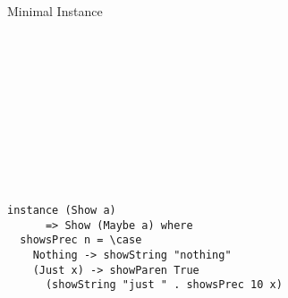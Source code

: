 \documentclass[aspectratio=169]{beamer}
\begin{document}
\begin{frame}[fragile]{Minimal Instance}
\hspace{-1cm}
\begin{minipage}{.59\textwidth}%
\begin{code}%
\>[0]\<%
\\
\>[0][@{}l@{\AgdaIndent{0}}]%
\>[2]\AgdaSpace{}%
\AgdaSymbol{:}\AgdaSpace{}%
\AgdaSymbol{\{\{}\AgdaSpace{}%
\AgdaSymbol{\}\}}\AgdaSpace{}%
\AgdaSpace{}%
\AgdaSpace{}%
\AgdaSymbol{(}\AgdaSpace{}%
\AgdaSymbol{)}\<%
\\
%
\>[2]\AgdaSpace{}%
\AgdaSymbol{\{}\AgdaSpace{}%
\AgdaSymbol{=}\AgdaSpace{}%
\AgdaSymbol{\}}\AgdaSpace{}%
\AgdaSymbol{=}\AgdaSpace{}%
\AgdaSpace{}%
\AgdaSymbol{\{}\AgdaSpace{}%
\AgdaSymbol{\}}\<%
\\
\>[2][@{}l@{\AgdaIndent{0}}]%
\>[4]\<%
\\
\>[4][@{}l@{\AgdaIndent{0}}]%
\>[6]\AgdaSpace{}%
\AgdaSymbol{:}\AgdaSpace{}%
\AgdaSpace{}%
\AgdaSymbol{(}\AgdaSpace{}%
\AgdaSymbol{)}\<%
\\
%
\>[6]\AgdaSpace{}%
\AgdaSpace{}%
\AgdaSpace{}%
\AgdaSymbol{=}\AgdaSpace{}%
\AgdaSpace{}%
\<%
\\
\>[6][@{}l@{\AgdaIndent{0}}]%
\>[8]%
\>[18]\AgdaSpace{}%
\AgdaSpace{}%
\<%
\\
%
\>[8]\AgdaSymbol{(}\AgdaSpace{}%
\AgdaSymbol{)}%
\>[18]\AgdaSpace{}%
\AgdaSpace{}%
\<%
\\
\>[8][@{}l@{\AgdaIndent{0}}]%
\>[10]\AgdaSymbol{(}\AgdaSpace{}%
\AgdaSpace{}%
\AgdaSpace{}%
\AgdaSpace{}%
\AgdaSpace{}%
\AgdaSpace{}%
\AgdaSpace{}%
\AgdaSymbol{)}\<%
\\
\>[0]\AgdaSymbol{\{-\#}\AgdaSpace{}%
\AgdaSpace{}%
\AgdaSpace{}%
\AgdaSpace{}%
\AgdaSymbol{\#-\}}\<%
\end{code}
\end{minipage}\hspace{-.6cm}\vrule\hspace{.05cm}
\begin{minipage}{.41\textwidth}%
\begin{verbatim}
instance (Show a)
      => Show (Maybe a) where
  showsPrec n = \case
    Nothing -> showString "nothing"
    (Just x) -> showParen True
      (showString "just " . showsPrec 10 x)
\end{verbatim}
\end{minipage}

\end{frame}
\end{document}
